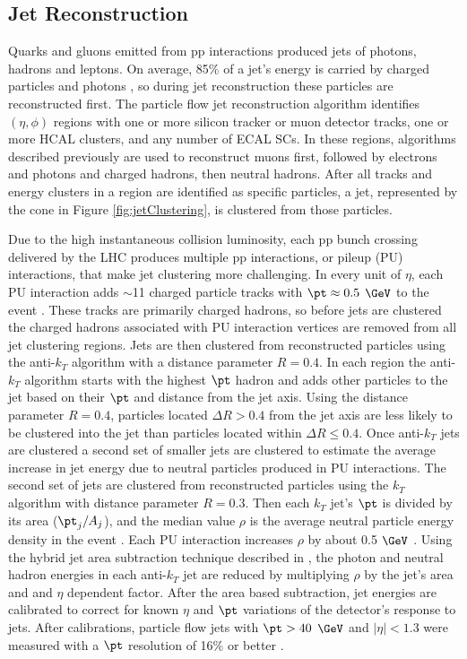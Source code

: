 \subsection{Jet Reconstruction}
\label{sec:jetReco}
Quarks and gluons emitted from pp interactions produced jets of photons, hadrons and leptons.  On average, 85\% of a jet's 
energy is carried by charged particles and photons \cite{pflowJetRecoInCollisions}, so during jet reconstruction these particles are 
reconstructed first.  The particle flow jet reconstruction algorithm \cite{pflowEventReco} identifies $(\eta,\phi)$ regions with one or 
more silicon tracker or muon detector tracks, one or more HCAL clusters, and any number of ECAL SCs.  In these regions, algorithms 
described previously are used to reconstruct muons first, followed by electrons and photons and charged hadrons, then neutral hadrons.  
After all tracks and energy clusters in a region are identified as specific particles, a jet, represented by the cone in Figure 
\ref{fig:jetClustering}, is clustered from those particles.

Due to the high instantaneous collision luminosity, each pp bunch crossing delivered by the LHC produces multiple pp interactions, 
or pileup (PU) interactions, that make jet clustering more challenging.  In every unit of $\eta$, each PU interaction adds 
$\sim$11 charged particle tracks with $\pt \approx 0.5$ $\GeV$ to the event \cite{chgdHdrMultInData}.  These tracks are primarily 
charged hadrons, so before jets are clustered the charged hadrons associated with PU interaction vertices are removed from 
all jet clustering regions.  Jets are then clustered from reconstructed particles using the anti-$k_{T}$ algorithm \cite{antikt} 
with a distance parameter $R = 0.4$.  In each region the anti-$k_{T}$ algorithm starts with the highest $\pt$ hadron and adds 
other particles to the jet based on their $\pt$ and distance from the jet axis.  Using the distance parameter $R = 0.4$, 
particles located $\Delta R > 0.4$ from the jet axis are less likely to be clustered into the jet than particles located within 
$\Delta R \leq 0.4$.  Once anti-$k_{T}$ jets are clustered a second set of smaller jets are clustered to estimate the average 
increase in jet energy due to neutral particles produced in PU interactions.  The second set of jets are clustered from 
reconstructed particles using the $k_{T}$ algorithm \cite{ktAlgoOne,ktAlgoTwo,ktAlgoThree} with distance parameter $R = 0.3$.  
Then each $k_{T}$ jet's $\pt$ is divided by its area ($\pt_{j} / A_{j}$), and the median value $\rho$ is the average neutral 
particle energy density in the event \cite{pileup1,pileup2}.  Each PU interaction increases $\rho$ by about 0.5 $\GeV$ 
\cite{jetResolutionInCollisions}.  Using the hybrid jet area subtraction technique described in \cite{pflowJetRecoInCollisions}, 
the photon and neutral hadron energies in each anti-$k_{T}$ jet are reduced by multiplying $\rho$ by the jet's area and and $\eta$ 
dependent factor.  After the area based subtraction, jet energies are calibrated to correct for known $\eta$ and $\pt$ variations 
of the detector's response to jets.  After calibrations, particle flow jets with $\pt > 40$ $\GeV$ and $|\eta| < 1.3$ were 
measured with a $\pt$ resolution of 16\% or better \cite{jetResolutionInCollisions}.

